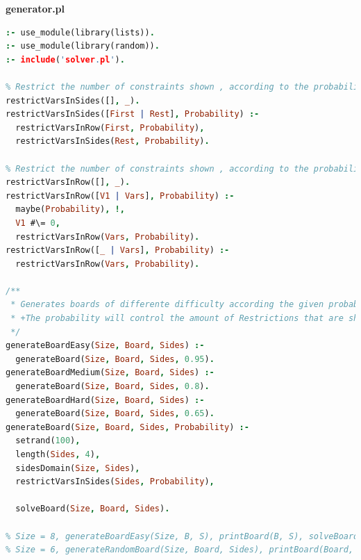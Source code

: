 \documentclass{llncs}
\begin{document}
\huge\textbf{generator.pl}
\begin{lstlisting}[language=Prolog]
:- use_module(library(lists)).
:- use_module(library(random)).
:- include('solver.pl').

% Restrict the number of constraints shown , according to the probability
restrictVarsInSides([], _).
restrictVarsInSides([First | Rest], Probability) :-
  restrictVarsInRow(First, Probability),
  restrictVarsInSides(Rest, Probability).

% Restrict the number of constraints shown , according to the probability
restrictVarsInRow([], _).
restrictVarsInRow([V1 | Vars], Probability) :-
  maybe(Probability), !,
  V1 #\= 0,
  restrictVarsInRow(Vars, Probability).
restrictVarsInRow([_ | Vars], Probability) :-
  restrictVarsInRow(Vars, Probability).

/**
 * Generates boards of differente difficulty according the given probability.
 * +The probability will control the amount of Restrictions that are shown.
 */
generateBoardEasy(Size, Board, Sides) :-
  generateBoard(Size, Board, Sides, 0.95).
generateBoardMedium(Size, Board, Sides) :-
  generateBoard(Size, Board, Sides, 0.8).
generateBoardHard(Size, Board, Sides) :-
  generateBoard(Size, Board, Sides, 0.65).
generateBoard(Size, Board, Sides, Probability) :-
  setrand(100),
  length(Sides, 4),
  sidesDomain(Size, Sides),
  restrictVarsInSides(Sides, Probability),

  solveBoard(Size, Board, Sides).

% Size = 8, generateBoardEasy(Size, B, S), printBoard(B, S), solveBoard(Size, SB, S), printBoard(SB, S).
% Size = 6, generateRandomBoard(Size, Board, Sides), printBoard(Board, Sides), solveBoard(Size, SameBoard, Sides), Board = SameBoard.

\end{lstlisting}
\newpage
\end{document}
